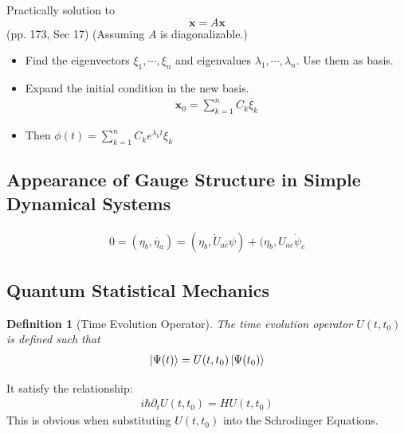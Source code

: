 \documentclass{article}
\numberwithin{equation}{subsection} %
\newtheorem{defi}{Definition}[section]
\theoremstyle{definition}
\begin{document}
    Practically solution to
    $$ \dot{\mathbf{x}} = A\mathbf{x}$$
    (pp. 173, Sec 17)
    (Assuming $A$ is diagonalizable.)
    \begin{itemize}
        \item Find the eigenvectors $\xi_1,\cdots ,\xi_n$ and eigenvalues
            $\lambda_1,\cdots ,\lambda_n$. Use them as basis.
        \item Expand the initial condition in the new basis.
            \begin{align}
                \mathbf{x}_0=\sum_{k=1}^{n} C_k\xi_k
            \end{align}
        \item Then $\phi(t) = \sum_{k=1}^n C_k e^{\lambda_k t}\xi_k$
    \end{itemize}
    \subsection{Appearance of Gauge Structure in Simple Dynamical Systems}
    
    \begin{align}
        0=(\eta_b,\dot{\eta_a}) = (\eta_b,\dot{U}_{ac}\psi) +
            (\eta_b,U_{ac}\dot{\psi}_c
    \end{align}
    \subsection{Quantum Statistical Mechanics}
    \label{sec:Quantum Statistical Mechanics}
    \begin{defi}[Time Evolution Operator]
        The time evolution operator $U(t,t_0)$ is defined such that
        \begin{align}
            \label{eq:def_time_evo_op}
            \ket{\Psi(t)} = U(t,t_0) \ket{\Psi(t_0)}
        \end{align}
    \end{defi}
    It satisfy the relationship:
    \begin{align}
        \label{eq:def_time_evo_op 2}
        i\hbar \partial_t U(t,t_0)= H U(t,t_0)
    \end{align}
    This is obvious when substituting $U(t,t_0)$ into the Schrodinger 
    Equations.
    
\end{document}
